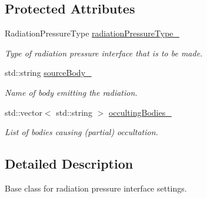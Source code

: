 \subsection*{Protected Attributes}
\begin{DoxyCompactItemize}
\item 
Radiation\+Pressure\+Type \hyperlink{classtudat_1_1simulation__setup_1_1RadiationPressureInterfaceSettings_a68b9103328b192c90d7beb7ce084f998}{radiation\+Pressure\+Type\+\_\+}\hypertarget{classtudat_1_1simulation__setup_1_1RadiationPressureInterfaceSettings_a68b9103328b192c90d7beb7ce084f998}{}\label{classtudat_1_1simulation__setup_1_1RadiationPressureInterfaceSettings_a68b9103328b192c90d7beb7ce084f998}

\begin{DoxyCompactList}\small\item\em Type of radiation pressure interface that is to be made. \end{DoxyCompactList}\item 
std\+::string \hyperlink{classtudat_1_1simulation__setup_1_1RadiationPressureInterfaceSettings_af442152cd28a6d9aca11490342baca8c}{source\+Body\+\_\+}\hypertarget{classtudat_1_1simulation__setup_1_1RadiationPressureInterfaceSettings_af442152cd28a6d9aca11490342baca8c}{}\label{classtudat_1_1simulation__setup_1_1RadiationPressureInterfaceSettings_af442152cd28a6d9aca11490342baca8c}

\begin{DoxyCompactList}\small\item\em Name of body emitting the radiation. \end{DoxyCompactList}\item 
std\+::vector$<$ std\+::string $>$ \hyperlink{classtudat_1_1simulation__setup_1_1RadiationPressureInterfaceSettings_a6d6175886647df2f5f990efe1ded7eba}{occulting\+Bodies\+\_\+}\hypertarget{classtudat_1_1simulation__setup_1_1RadiationPressureInterfaceSettings_a6d6175886647df2f5f990efe1ded7eba}{}\label{classtudat_1_1simulation__setup_1_1RadiationPressureInterfaceSettings_a6d6175886647df2f5f990efe1ded7eba}

\begin{DoxyCompactList}\small\item\em List of bodies causing (partial) occultation. \end{DoxyCompactList}\end{DoxyCompactItemize}


\subsection{Detailed Description}
Base class for radiation pressure interface settings. 


